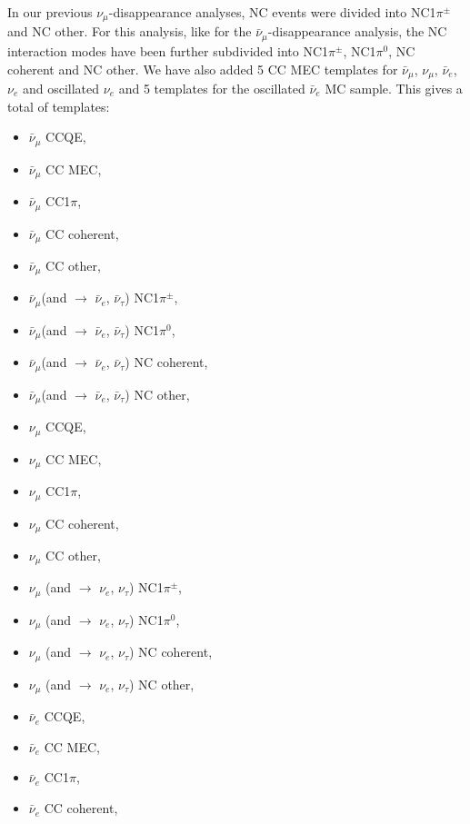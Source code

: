 In our previous $\nu_{\mu}$-disappearance analyses, NC events were divided into NC1$\pi^{\pm}$ and NC other. For this analysis,
like for the $\bar{\nu}_{\mu}$-disappearance analysis, the NC interaction modes have been further subdivided into NC1$\pi^{\pm}$, 
NC1$\pi^{0}$, NC coherent and NC other. We have also added 5 CC MEC templates for $\bar{\nu}_{\mu}$, $\nu_{\mu}$, $\bar{\nu}_{e}$, 
$\nu_{e}$ and oscillated $\nu_{e}$ and 5 templates for the oscillated $\bar{\nu}_{e}$ MC sample. This gives a 
total of \NMCTemplate{} templates: 
\begin{itemize}
\item  $\bar{\nu}_{\mu}$ CCQE,
\item  $\bar{\nu}_{\mu}$ CC MEC,
\item  $\bar{\nu}_{\mu}$ CC1$\pi$,
\item  $\bar{\nu}_{\mu}$ CC coherent,
\item  $\bar{\nu}_{\mu}$ CC other,
\item  $\bar{\nu}_{\mu}$(and $\rightarrow$ $\bar{\nu}_{e}$, $\bar{\nu}_{\tau}$) NC1$\pi^{\pm}$,
\item  $\bar{\nu}_{\mu}$(and $\rightarrow$ $\bar{\nu}_{e}$, $\bar{\nu}_{\tau}$) NC1$\pi^{0}$,
\item  $\bar{\nu}_{\mu}$(and $\rightarrow$ $\bar{\nu}_{e}$, $\bar{\nu}_{\tau}$) NC coherent,
\item  $\bar{\nu}_{\mu}$(and $\rightarrow$ $\bar{\nu}_{e}$, $\bar{\nu}_{\tau}$) NC other,
\item  $\nu_{\mu}$ CCQE,
\item  $\nu_{\mu}$ CC MEC,
\item  $\nu_{\mu}$ CC1$\pi$, 
\item  $\nu_{\mu}$ CC coherent, 
\item  $\nu_{\mu}$ CC other, 
\item  $\nu_{\mu}$ (and $\rightarrow$ $\nu_{e}$, $\nu_{\tau}$) NC1$\pi^{\pm}$, 
\item  $\nu_{\mu}$ (and $\rightarrow$ $\nu_{e}$, $\nu_{\tau}$) NC1$\pi^{0}$,
\item  $\nu_{\mu}$ (and $\rightarrow$ $\nu_{e}$, $\nu_{\tau}$) NC coherent,
\item  $\nu_{\mu}$ (and $\rightarrow$ $\nu_{e}$, $\nu_{\tau}$) NC other, 
\item  $\bar{\nu}_{e}$ CCQE,
\item  $\bar{\nu}_{e}$ CC MEC,
\item  $\bar{\nu}_{e}$ CC1$\pi$,
\item  $\bar{\nu}_{e}$ CC coherent,

\end{itemize}
